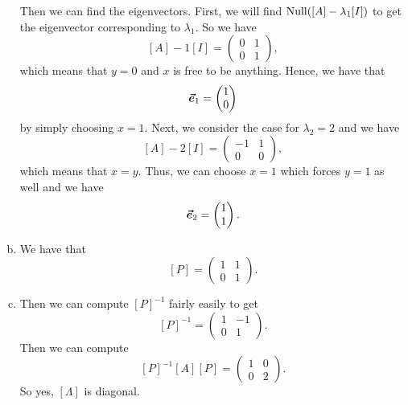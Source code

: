 \documentclass[12pt]{article} %
\begin{document}
\begin{solution}
\begin{enumerate}[(a)]
    Then we can find the eigenvectors. First, we will find $\mathrm{Null}([A]-\lambda_1 [I])$ to get the eigenvector corresponding to $\lambda_1$. So we have
    \[
    [A]-1[I]= \begin{pmatrix} 0 & 1 \\ 0 & 1 \end{pmatrix},
    \]
    which means that $y=0$ and $x$ is free to be anything. Hence, we have that
    \[
    \boldsymbol{\vec{e}}_1 = \begin{pmatrix} 1 \\ 0 \end{pmatrix}
    \]
    by simply choosing $x=1$. Next, we consider the case for $\lambda_2 = 2$ and we have
    \[
    [A]-2[I] = \begin{pmatrix} -1 & 1 \\ 0 & 0 \end{pmatrix},
    \]
    which means that $x=y$. Thus, we can choose $x=1$ which forces $y=1$ as well and we have
    \[
    \boldsymbol{\vec{e}}_2 = \begin{pmatrix} 1 \\ 1\end{pmatrix}.
    \]
    \item We have that
    \[
    [P]=\begin{pmatrix} 1 & 1 \\ 0 & 1 \end{pmatrix}.
    \]
    \item Then we can compute $[P]^{-1}$ fairly easily to get
    \[
    [P]^{-1} = \begin{pmatrix} 1 & -1\\ 0  & 1 \end{pmatrix}.
    \]
    Then we can compute
    \[
    [P]^{-1}[A][P] = \begin{pmatrix} 1 & 0 \\ 0 & 2 \end{pmatrix}.
    \]
    So yes, $[\Lambda]$ is diagonal.
\end{enumerate}
\end{solution}
\end{document}
